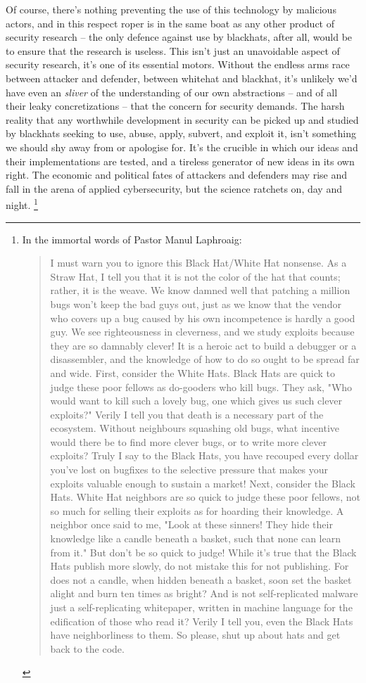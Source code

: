 \documentclass[12pt,glossary]{dalthesis}
\begin{document}
Of course, there's nothing preventing the use of this technology by malicious
actors, and in this respect \gls{roper} is in the same boat as any other product
of security research -- the only defence against use by blackhats, after all,
would be to ensure that the research is useless. This isn't just an unavoidable
aspect of security research, it's one of its essential motors. Without the endless
arms race between attacker and defender, between whitehat and blackhat, it's
unlikely we'd have even an \emph{sliver} of the understanding of our own
abstractions -- and of all their leaky concretizations -- that the concern for
security demands. The harsh reality that any worthwhile development in security
can be picked up and studied by blackhats seeking to use, abuse, apply, subvert,
and exploit it, isn't something we should shy away from or apologise for. It's the
crucible in which our ideas and their implementations are tested, and a tireless
generator of new ideas in its own right. The economic and political fates of
attackers and defenders may rise and fall in the arena of applied cybersecurity,
but the science ratchets on, day and night.
\footnote{In the immortal words of Pastor Manul Laphroaig:
\begin{quote}
I must warn you to ignore this Black Hat/White Hat nonsense. As a Straw Hat,
I tell you that it is not the color of the hat that counts; rather, it is the
weave. We know damned well that patching a million bugs won't keep the bad guys
out, just as we know that the vendor who covers up a bug caused by his own
incompetence is hardly a good guy. We see righteousness in cleverness, and we
study exploits because they are so damnably clever! It is a heroic act to build
a debugger or a disassembler, and the knowledge of how to do so ought to be
spread far and wide.
First, consider the White Hats. Black Hats are quick to judge these poor fellows
as do-gooders who kill bugs. They ask, "Who would want to kill such a lovely bug,
one which gives us such clever exploits?" Verily I tell you that death is a
necessary part of the ecosystem. Without neighbours squashing old bugs, what
incentive would there be to find more clever bugs, or to write more clever
exploits? Truly I say to the Black Hats, you have recouped every dollar you've
lost on bugfixes to the selective pressure that makes your exploits valuable
enough to sustain a market!
Next, consider the Black Hats. White Hat neighbors are so quick to judge these
poor fellows, not so much for selling their exploits as for hoarding their
knowledge. A neighbor once said to me, "Look at these sinners! They hide their
knowledge like a candle beneath a basket, such that none can learn from it."
But don't be so quick to judge! While it's true that the Black Hats publish
more slowly, do not mistake this for not publishing. For does not a candle,
when hidden beneath a basket, soon set the basket alight and burn ten times as
bright? And is not self-replicated malware just a self-replicating whitepaper,
written in machine language for the edification of those who read it? Verily
I tell you, even the Black Hats have neighborliness to them.
So please, shut up about hats and get back to the code.
\end{quote}}
\end{document}
